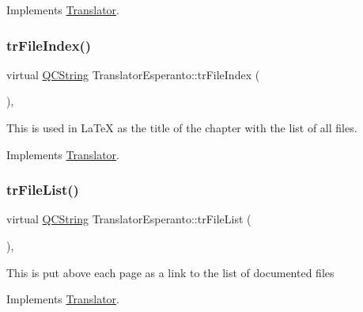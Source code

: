 Implements \mbox{\hyperlink{class_translator}{Translator}}.

\mbox{\label{class_translator_esperanto_adb708248ddcb1af159c782a4538bddb4}} 
\subsubsection{\texorpdfstring{trFileIndex()}{trFileIndex()}}
{\footnotesize\ttfamily virtual \mbox{\hyperlink{class_q_c_string}{Q\+C\+String}} Translator\+Esperanto\+::tr\+File\+Index (\begin{DoxyParamCaption}{ }\end{DoxyParamCaption})\hspace{0.3cm}{\ttfamily [inline]}, {\ttfamily [virtual]}}

This is used in La\+TeX as the title of the chapter with the list of all files. 

Implements \mbox{\hyperlink{class_translator}{Translator}}.

\mbox{\label{class_translator_esperanto_a1c5b706e4fe6d9a16216935cfa5fc5f5}} 
\subsubsection{\texorpdfstring{trFileList()}{trFileList()}}
{\footnotesize\ttfamily virtual \mbox{\hyperlink{class_q_c_string}{Q\+C\+String}} Translator\+Esperanto\+::tr\+File\+List (\begin{DoxyParamCaption}{ }\end{DoxyParamCaption})\hspace{0.3cm}{\ttfamily [inline]}, {\ttfamily [virtual]}}

This is put above each page as a link to the list of documented files 

Implements \mbox{\hyperlink{class_translator}{Translator}}.

\mbox{\label{class_translator_esperanto_a930891243adea12fb2cd64fdd0f8b7d2}} 
